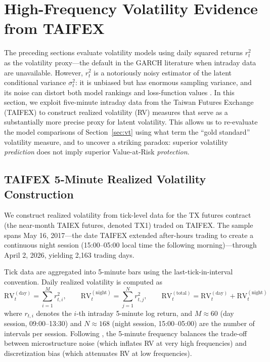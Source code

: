 
\section{High-Frequency Volatility Evidence from TAIFEX}
\label{sec:hf}

The preceding sections evaluate volatility models using daily squared returns $r_t^2$ as the volatility proxy---the default in the GARCH literature when intraday data are unavailable. However, $r_t^2$ is a notoriously noisy estimator of the latent conditional variance $\sigma_t^2$: it is unbiased but has enormous sampling variance, and its noise can distort both model rankings and loss-function values \citep{patton2011}. In this section, we exploit five-minute intraday data from the Taiwan Futures Exchange (TAIFEX) to construct realized volatility (RV) measures that serve as a substantially more precise proxy for latent volatility. This allows us to re-evaluate the model comparisons of Section~\ref{sec:vt} using what \citet{hansen2005} term the ``gold standard'' volatility measure, and to uncover a striking paradox: superior volatility \textit{prediction} does not imply superior Value-at-Risk \textit{protection}.


\subsection{TAIFEX 5-Minute Realized Volatility Construction}
\label{sec:hf_rv}

We construct realized volatility from tick-level data for the TX futures contract (the near-month TAIEX futures, denoted TX1) traded on TAIFEX. The sample spans May 16, 2017---the date TAIFEX extended after-hours trading to create a continuous night session (15:00--05:00 local time the following morning)---through April 2, 2026, yielding 2,163 trading days.

Tick data are aggregated into 5-minute bars using the last-tick-in-interval convention. Daily realized volatility is computed as
\begin{equation}
\text{RV}_t^{(\text{day})} = \sum_{i=1}^{M} r_{t,i}^2, \qquad
\text{RV}_t^{(\text{night})} = \sum_{j=1}^{N} r_{t,j}^2, \qquad
\text{RV}_t^{(\text{total})} = \text{RV}_t^{(\text{day})} + \text{RV}_t^{(\text{night})}
\label{eq:rv}
\end{equation}
where $r_{t,i}$ denotes the $i$-th intraday 5-minute log return, and $M \approx 60$ (day session, 09:00--13:30) and $N \approx 168$ (night session, 15:00--05:00) are the number of intervals per session. Following \citet{hansen2005}, the 5-minute frequency balances the trade-off between microstructure noise (which inflates RV at very high frequencies) and discretization bias (which attenuates RV at low frequencies).

